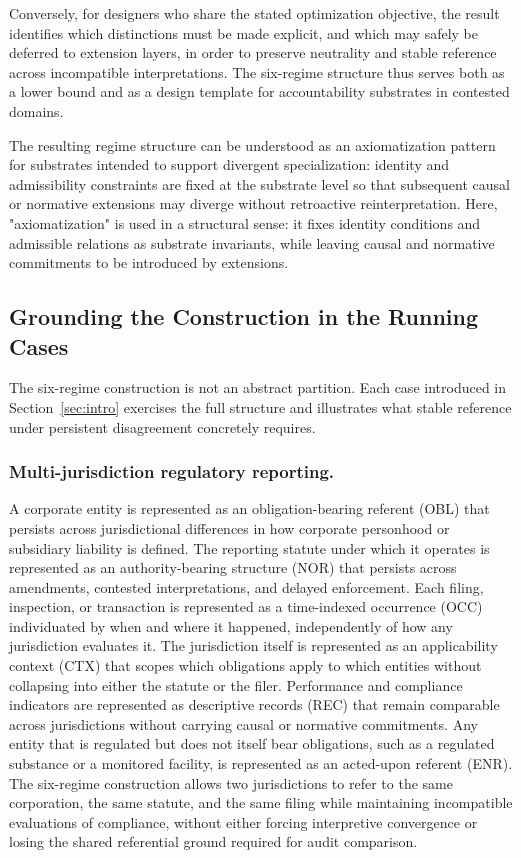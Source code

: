 Conversely, for designers who share the stated optimization objective, the
result identifies which distinctions must be made explicit,
and which may safely be deferred to extension layers,
in order to preserve neutrality and stable reference
across incompatible interpretations.
The six-regime structure thus serves both as a lower bound and
as a design template for accountability substrates in contested domains.

The resulting regime structure can be understood
as an axiomatization pattern for substrates
intended to support divergent specialization:
identity and admissibility constraints
are fixed at the substrate level so that
subsequent causal or normative extensions
may diverge without retroactive reinterpretation.
Here, "axiomatization" is used in a structural sense:
it fixes identity conditions and admissible relations
as substrate invariants, while leaving
causal and normative commitments to be introduced by extensions.

\subsection{Grounding the Construction in the Running Cases}

The six-regime construction is not an abstract partition.
Each case introduced in Section~\ref{sec:intro} exercises the full structure and
illustrates what stable reference under persistent disagreement concretely requires.

\subsubsection{Multi-jurisdiction regulatory reporting.}
A corporate entity is represented as an obligation-bearing referent (OBL)
that persists across jurisdictional differences in how corporate
personhood or subsidiary liability is defined.
The reporting statute under which it operates is represented as an
authority-bearing structure (NOR) that persists across amendments,
contested interpretations, and delayed enforcement.
Each filing, inspection, or transaction is represented as a
time-indexed occurrence (OCC) individuated by when and where it happened,
independently of how any jurisdiction evaluates it.
The jurisdiction itself is represented as an applicability context (CTX)
that scopes which obligations apply to which entities without collapsing
into either the statute or the filer.
Performance and compliance indicators are represented as descriptive
records (REC) that remain comparable across jurisdictions without
carrying causal or normative commitments.
Any entity that is regulated but does not itself bear obligations,
such as a regulated substance or a monitored facility, is
represented as an acted-upon referent (ENR).
The six-regime construction allows two jurisdictions to refer to the
same corporation, the same statute, and the same filing while
maintaining incompatible evaluations of compliance,
without either forcing interpretive convergence or losing
the shared referential ground required for audit comparison.

